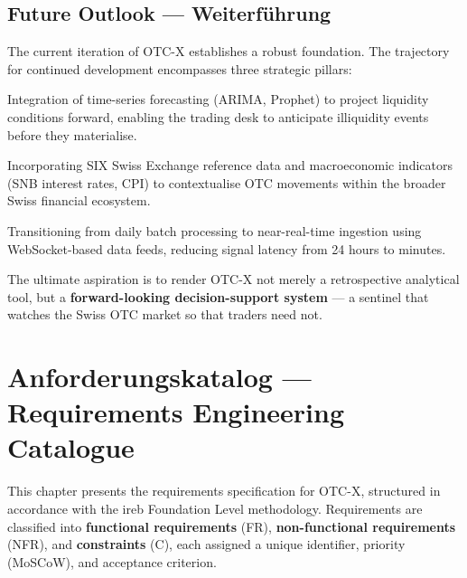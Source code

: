 \documentclass[
  11pt,
  a4paper,
  twoside,
  openany
]{report}
\begin{document}
\section{Future Outlook — Weiterführung}

The current iteration of OTC-X establishes a robust foundation.  The trajectory for continued development encompasses three strategic pillars:

\begin{description}[style=nextline, leftmargin=1.5em]
  \item[\textcolor{SwissRed}{Pillar I — Predictive Analytics}]
  Integration of time-series forecasting (ARIMA, Prophet) to project liquidity conditions forward, enabling the trading desk to anticipate illiquidity events before they materialise.
  \item[\textcolor{SwissRed}{Pillar II — Cross-Market Enrichment}]
  Incorporating SIX Swiss Exchange reference data and macroeconomic indicators (SNB interest rates, CPI) to contextualise OTC movements within the broader Swiss financial ecosystem.
  \item[\textcolor{SwissRed}{Pillar III — Real-Time Streaming}]
  Transitioning from daily batch processing to near-real-time ingestion using WebSocket-based data feeds, reducing signal latency from 24 hours to minutes.
\end{description}

\begin{insightbox}
The ultimate aspiration is to render OTC-X not merely a retrospective analytical tool, but a \textbf{forward-looking decision-support system} — a sentinel that watches the Swiss OTC market so that traders need not.
\end{insightbox}


\chapter{Anforderungskatalog — Requirements Engineering Catalogue}
\label{ch:requirements}

This chapter presents the requirements specification for OTC-X, structured in accordance with the \gls{ireb} Foundation Level methodology.  Requirements are classified into \textbf{functional requirements} (FR), \textbf{non-functional requirements} (NFR), and \textbf{constraints} (C), each assigned a unique identifier, priority (MoSCoW), and acceptance criterion.
\end{document}
